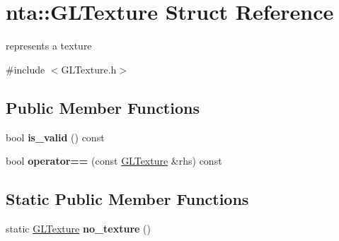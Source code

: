 \hypertarget{structnta_1_1GLTexture}{}\section{nta\+:\+:G\+L\+Texture Struct Reference}
\label{structnta_1_1GLTexture}


represents a texture  




{\ttfamily \#include $<$G\+L\+Texture.\+h$>$}

\subsection*{Public Member Functions}
\begin{DoxyCompactItemize}
\item 
\mbox{\label{structnta_1_1GLTexture_a85233cfdf7788bc8461435482caf01d9}} 
bool {\bfseries is\+\_\+valid} () const
\item 
\mbox{\label{structnta_1_1GLTexture_a80210ac5abe1be0a15c038fd966f41ec}} 
bool {\bfseries operator==} (const \hyperlink{structnta_1_1GLTexture}{G\+L\+Texture} \&rhs) const
\end{DoxyCompactItemize}
\subsection*{Static Public Member Functions}
\begin{DoxyCompactItemize}
\item 
\mbox{\label{structnta_1_1GLTexture_abc80887334f8020512952c6093e99f14}} 
static \hyperlink{structnta_1_1GLTexture}{G\+L\+Texture} {\bfseries no\+\_\+texture} ()
\end{DoxyCompactItemize}
